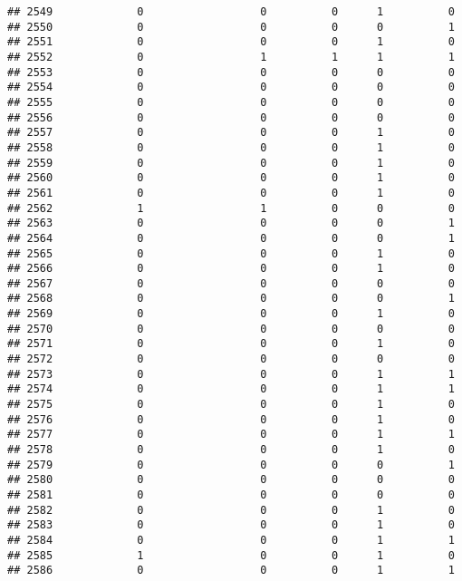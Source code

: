 \documentclass[
]{article}
\begin{document}
\begin{verbatim}
## 2549             0                  0          0      1          0
## 2550             0                  0          0      0          1
## 2551             0                  0          0      1          0
## 2552             0                  1          1      1          1
## 2553             0                  0          0      0          0
## 2554             0                  0          0      0          0
## 2555             0                  0          0      0          0
## 2556             0                  0          0      0          0
## 2557             0                  0          0      1          0
## 2558             0                  0          0      1          0
## 2559             0                  0          0      1          0
## 2560             0                  0          0      1          0
## 2561             0                  0          0      1          0
## 2562             1                  1          0      0          0
## 2563             0                  0          0      0          1
## 2564             0                  0          0      0          1
## 2565             0                  0          0      1          0
## 2566             0                  0          0      1          0
## 2567             0                  0          0      0          0
## 2568             0                  0          0      0          1
## 2569             0                  0          0      1          0
## 2570             0                  0          0      0          0
## 2571             0                  0          0      1          0
## 2572             0                  0          0      0          0
## 2573             0                  0          0      1          1
## 2574             0                  0          0      1          1
## 2575             0                  0          0      1          0
## 2576             0                  0          0      1          0
## 2577             0                  0          0      1          1
## 2578             0                  0          0      1          0
## 2579             0                  0          0      0          1
## 2580             0                  0          0      0          0
## 2581             0                  0          0      0          0
## 2582             0                  0          0      1          0
## 2583             0                  0          0      1          0
## 2584             0                  0          0      1          1
## 2585             1                  0          0      1          0
## 2586             0                  0          0      1          1

\end{verbatim}
\end{document}
